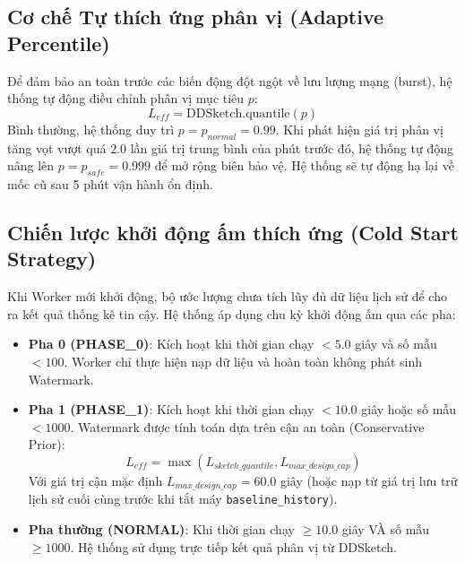 \documentclass[12pt,a4paper]{article}
\begin{document}
\subsection{Cơ chế Tự thích ứng phân vị (Adaptive Percentile)}
Để đảm bảo an toàn trước các biến động đột ngột về lưu lượng mạng (burst), hệ thống tự động điều chỉnh phân vị mục tiêu $p$:
\begin{equation}
L_{eff} = \text{DDSketch.quantile}(p)
\end{equation}
Bình thường, hệ thống duy trì $p = p_{normal} = 0.99$. Khi phát hiện giá trị phân vị tăng vọt vượt quá $2.0$ lần giá trị trung bình của phút trước đó, hệ thống tự động nâng lên $p = p_{safe} = 0.999$ để mở rộng biên bảo vệ. Hệ thống sẽ tự động hạ lại về mốc cũ sau 5 phút vận hành ổn định.

\subsection{Chiến lược khởi động ấm thích ứng (Cold Start Strategy)}
Khi Worker mới khởi động, bộ ước lượng chưa tích lũy đủ dữ liệu lịch sử để cho ra kết quả thống kê tin cậy. Hệ thống áp dụng chu kỳ khởi động ấm qua các pha:
\begin{itemize}
    \item \textbf{Pha 0 (PHASE\_0)}: Kích hoạt khi thời gian chạy $< 5.0$ giây và số mẫu $< 100$. Worker chỉ thực hiện nạp dữ liệu và hoàn toàn không phát sinh Watermark.
    \item \textbf{Pha 1 (PHASE\_1)}: Kích hoạt khi thời gian chạy $< 10.0$ giây hoặc số mẫu $< 1000$. Watermark được tính toán dựa trên cận an toàn (Conservative Prior):
    \begin{equation}
    L_{eff} = \max(L_{sketch\_quantile}, L_{max\_design\_cap})
    \end{equation}
    Với giá trị cận mặc định $L_{max\_design\_cap} = 60.0$ giây (hoặc nạp từ giá trị lưu trữ lịch sử cuối cùng trước khi tắt máy \texttt{baseline\_history}).
    \item \textbf{Pha thường (NORMAL)}: Khi thời gian chạy $\ge 10.0$ giây VÀ số mẫu $\ge 1000$. Hệ thống sử dụng trực tiếp kết quả phân vị từ DDSketch.
\end{itemize}
\end{document}

